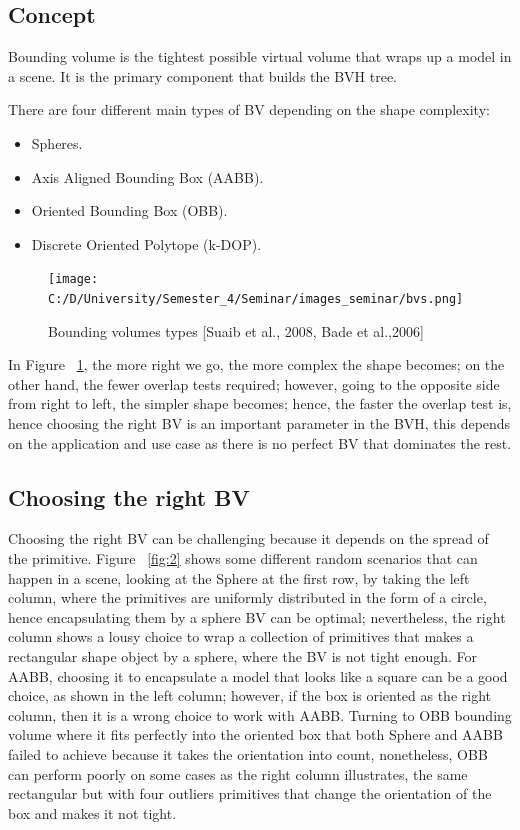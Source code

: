 \documentclass[11pt,a4paper]{article}
\begin{document}
	\subsection{Concept}
	Bounding volume is the tightest possible virtual volume that wraps up a model in a scene. It is the primary component that builds the BVH tree.
	
	There are four different main types of BV depending on the shape complexity:
	
	\begin{itemize}
		\item Spheres.
		\item Axis Aligned Bounding Box (AABB).
		\item Oriented Bounding Box (OBB).
		\item Discrete Oriented Polytope (k-DOP).
		
	\end{itemize}
	
	\begin{figure}[h]
		\begin{center}
			\texttt{[image: C:/D/University/Semester\_4/Seminar/images\_seminar/bvs.png]}
			
			\caption{Bounding volumes types [Suaib et al., 2008, Bade et al.,2006]}
			\label{fig:1}
		\end{center}
	\end{figure}
	
	
	In Figure ~\ref{fig:1}, the more right we go, the more complex the shape becomes; on the other hand, the fewer overlap tests required; however, going to the opposite side from right to left, the simpler shape becomes; hence, the faster the overlap test is, hence choosing the right BV is an important parameter in the BVH, this depends on the application and use case as there is no perfect BV that dominates the rest.
	
	\subsection{Choosing the right BV}
	Choosing the right BV can be challenging because it depends on the spread of the primitive.
	Figure ~\ref{fig:2} shows some different random scenarios that can happen in a scene, looking at the Sphere at the first row, by taking the left column, where the primitives are uniformly distributed in the form of a circle, hence encapsulating them by a sphere BV can be optimal; nevertheless, the right column shows a lousy choice to wrap a collection of primitives that makes a rectangular shape object by a sphere, where the BV is not tight enough. 
	For AABB, choosing it to encapsulate a model that looks like a square can be a good choice, as shown in the left column; however, if the box is oriented as the right column, then it is a wrong choice to work with AABB. 
	Turning to OBB bounding volume where it fits perfectly into the oriented box that both Sphere and AABB failed to achieve because it takes the orientation into count, nonetheless, OBB can perform poorly on some cases as the right column illustrates, the same rectangular but with four outliers primitives that change the orientation of the box and makes it not tight. 
	
\end{document}
